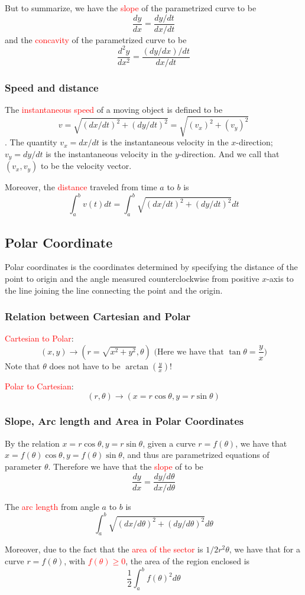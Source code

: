\documentclass[12pt]{article}
\theoremstyle{definition}
\theoremstyle{definition}
\theoremstyle{remark}
\theoremstyle{definition}
\theoremstyle{definition}
\theoremstyle{definition}
\begin{document}
But to summarize, we have the \textcolor{red}{slope} of the parametrized curve to be 
\[\frac{dy}{dx}=\frac{dy/dt}{dx/dt}\]
and the \textcolor{red}{concavity} of the parametrized curve to be
\[\frac{d^2y}{dx^2}=\frac{(dy/dx)/dt}{dx/dt}\]

\subsubsection{Speed and distance}

The \textcolor{red}{instantaneous speed} of a moving object is defined to be
$$v = \sqrt{(dx/dt)^2 + (dy/dt)^2} =\sqrt{(v_x)^2 + (v_y)^2}$$.
The quantity $v_x = dx/dt$ is the instantaneous velocity in the $x$-direction; $v_y = dy/dt$ is the
instantaneous velocity in the $y$-direction.
And we call that $(v_x,v_y)$ to be the velocity vector.

Moreover, the \textcolor{red}{distance} traveled from time $a$ to $b$ is $$\int^b_a v(t) dt = \int_a^b \sqrt{(dx/dt)^2 + (dy/dt)^2} dt$$

\subsection{Polar Coordinate}

Polar coordinates is the coordinates determined by specifying the distance of the point to origin and the angle measured counterclockwise from positive $x$-axis to the line joining the line connecting the point and the origin.

\subsubsection{Relation between Cartesian and Polar}

\textcolor{red}{Cartesian to Polar}: $$(x,y) \to (r= \sqrt{x^2 + y^2}, \theta) \text{ (Here we have that } \tan \theta = \frac{y}{x} \text{)}$$
Note that $\theta$ does not have to be $\arctan(\frac{y}{x})$!

\textcolor{red}{Polar to Cartesian}: $$(r,\theta) \to (x=r \cos \theta, y=r \sin \theta)$$

\subsubsection{Slope, Arc length and Area in Polar Coordinates}

By the relation $x=r \cos \theta, y=r \sin \theta$, given a curve $r=f(\theta)$, we have that $x=f(\theta) \cos \theta, y=f(\theta) \sin \theta$, and thus are parametrized equations of parameter $\theta$. Therefore we have that the \textcolor{red}{slope} of to be 
\[\frac{dy}{dx}=\frac{dy/d\theta}{dx/d\theta}\]

The \textcolor{red}{arc length} from angle $a$ to $b$ is $$\int_a^b \sqrt{(dx/d\theta)^2 + (dy/d\theta)^2} d\theta$$

Moreover, due to the fact that the \textcolor{red}{area of the sector} is $1/2 r^2 \theta$, we have that for a curve $r = f(\theta)$, with \textcolor{red}{$f(\theta) \geq 0$}, the area of the region enclosed is $$\frac{1}{2}\int^{b}_{a}f(\theta)^2 d\theta$$
\end{document}
